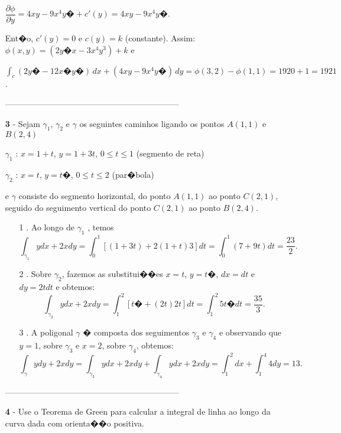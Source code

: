 \documentclass[12pt]{article}
\begin{document}
\begin{enumerate}
          $\dfrac{\partial \phi}{\partial y} = 4xy - 9x^4y� + c'(y) = 4xy - 9x^4y�$.

          Ent�o, $c'(y)=0$ e $c(y)=k$ (constante). Assim: $\phi(x,y)=(2y�x-3x^4y^3) + k $ e

          $\int_c (2y�-12x�y�)\,dx + (4xy - 9x^4y�)\,dy = \phi(3,2) - \phi(1,1) = 1920 + 1 = 1921$.

          \singlespacing
          \begin{center}
              ---------------------------------------------------------------
          \end{center}
    \item[\textbf{3}]- Sejam $\gamma_1$, $\gamma_2$ e $\gamma$ os seguintes caminhos ligando os pontos $A(1,1)$ e $B(2,4)$


          \begin{center}
              $\gamma_1$ : $x = 1 + t$, $y=1+ 3t$, $0\leqslant t \leqslant 1$ (segmento de reta)

              $\gamma_2$ : $x=t$, $y=t�$, $0\leqslant t \leqslant 2$ (par�bola)
          \end{center}

          e $\gamma$ consiste do segmento horizontal, do ponto $A(1,1)$ ao ponto $C(2,1)$, seguido do seguimento vertical do ponto $C(2,1)$ ao ponto $B(2,4)$.

          \begin{enumerate}
              \item[1]. Ao longo de $\gamma_1$ , temos
                    $$\int_{\gamma_1} ydx + 2xdy = \int_{0}^{1} [(1+3t) + 2(1+t)3]dt = \int_{0}^{1}(7+9t)dt = \dfrac{23}{2}. $$

              \item[2]. Sobre $\gamma_2$, fazemos as substitui��es $x=t$, $y=t�$, $dx=dt$ e $dy=2tdt$ e obtemos:
                    $$\int_{\gamma_2} ydx + 2xdy = \int_1^2 [t�+(2t)2t]dt = \int_1^2 5t�dt = \dfrac{35}{3}.$$

              \item[3]. A poligonal $\gamma$ � composta dos seguimentos $\gamma_3$ e $\gamma_4$ e observando que $y=1$, sobre $\gamma_3$ e $x=2$, sobre $\gamma_4$, obtemos:
                    $$\int_\gamma ydy + 2xdy = \int_{\gamma_3} ydx + 2xdy + \int_{\gamma_4} ydx + 2xdy = \int_1^2 dx + \int_1^4 4dy = 13.$$
          \end{enumerate}
          \begin{center}
              ---------------------------------------------------------------
          \end{center}
    \item[\textbf{4}]- Use o Teorema de Green para calcular a integral de linha ao longo da curva dada com orienta��o positiva.


\end{enumerate}
\end{document}
